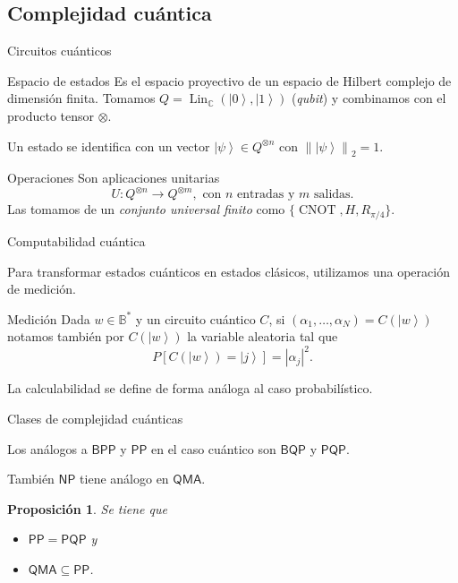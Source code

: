 \documentclass[ignorenonframetext,aspectratio=43,]{beamer}
\newtheorem{proposicion}{Proposición}
\newcommand{\ket}[1]{\left|#1\right\rangle}
\newcommand{\CC}{\mathbb{C}}
\newcommand{\BB}{\mathbb{B}}
\newcommand{\norm}[1]{\left\lVert#1\right\rVert}
\begin{document}
\subsection{Complejidad cuántica}

\begin{frame}{Circuitos cuánticos}

    \begin{block}{Espacio de estados}
    Es el espacio proyectivo de un espacio de Hilbert complejo de dimensión finita.
    Tomamos $Q = \operatorname{Lin}_{\CC}(\ket{0},\ket{1})$ (\emph{qubit})
    y combinamos con el producto tensor $\otimes$.

    \pause

    Un estado se identifica con un vector $\ket{\psi} \in Q^{\otimes n}$  con $\norm{\ket{\psi}}_2 = 1$.
  \end{block}

  \pause

  \begin{block}{Operaciones}
    Son aplicaciones unitarias
    $$U : Q^{\otimes n} \to  Q^{\otimes m},  \text{ con } n \text{ entradas y } m \text{ salidas.}$$
    Las tomamos de un \emph{conjunto universal finito} como $\{\operatorname{CNOT}, H, R_{\pi/4}\}$.
  \end{block}

\end{frame}


\begin{frame}{Computabilidad cuántica}

  Para transformar estados cuánticos en estados clásicos, utilizamos una operación de medición.

    \begin{block}{Medición}
      Dada $w \in \BB^\ast$ y un circuito cuántico $C$, si $(\alpha_1, \dots, \alpha_N) = C(\ket{w})$
      notamos también por $C(\ket{w})$
      la variable aleatoria tal que $$P[C(\ket{w}) = \ket{j}] = |\alpha_j|^2.$$
    \end{block}

    La calculabilidad se define de forma análoga al caso probabilístico.

\end{frame}


\begin{frame}{Clases de complejidad cuánticas}

  Los análogos a $\mathsf{BPP}$ y $\mathsf{PP}$ en el caso cuántico son $\mathsf{BQP}$ y $\mathsf{PQP}$.

  También $\mathsf{NP}$ tiene análogo en $\mathsf{QMA}$.

  \begin{proposicion}
    Se tiene que
    \begin{itemize}
    \item $\mathsf{PP} = \mathsf{PQP}$ y
    \item $\mathsf{QMA} \subseteq \mathsf{PP}$.
    \end{itemize}
  \end{proposicion}

\end{frame}
\end{document}
